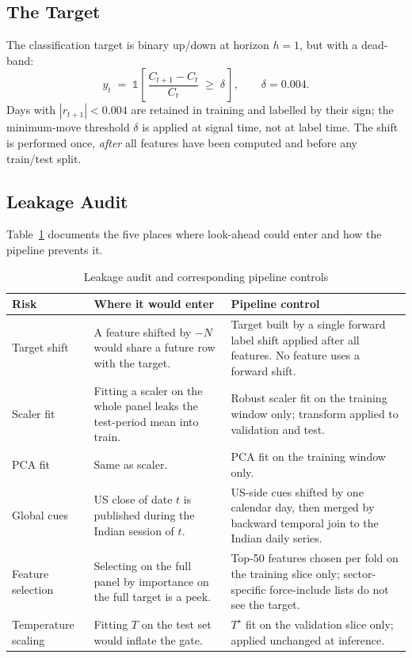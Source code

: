 \subsection{The Target}

The classification target is binary up/down at horizon $h = 1$, but with a dead-band:
\[
    y_t \;=\; \mathbb{1}\!\left[\, \frac{C_{t+1} - C_t}{C_t} \;\geq\; \delta \,\right], \qquad \delta = 0.004.
\]
Days with $|r_{t+1}| < 0.004$ are retained in training and labelled by their sign; the minimum-move threshold $\delta$ is applied at signal time, not at label time. The shift is performed once, \emph{after} all features have been computed and before any train/test split.

\subsection{Leakage Audit}

Table~\ref{tab:leakage_audit} documents the five places where look-ahead could enter and how the pipeline prevents it.

\begin{table}[H]
\centering
\caption{Leakage audit and corresponding pipeline controls}
\label{tab:leakage_audit}
\renewcommand{\arraystretch}{1.25}
\footnotesize
\begin{tabularx}{\textwidth}{@{}>{\raggedright\arraybackslash}p{2.6cm} >{\raggedright\arraybackslash}X >{\raggedright\arraybackslash}X@{}}
\toprule
\textbf{Risk} & \textbf{Where it would enter} & \textbf{Pipeline control} \\
\midrule
Target shift              & A feature shifted by $-N$ would share a future row with the target. & Target built by a single forward label shift applied after all features. No feature uses a forward shift. \\
Scaler fit                & Fitting a scaler on the whole panel leaks the test-period mean into train. & Robust scaler fit on the training window only; transform applied to validation and test. \\
PCA fit                   & Same as scaler.                                                       & PCA fit on the training window only. \\
Global cues               & US close of date $t$ is published during the Indian session of $t$. & US-side cues shifted by one calendar day, then merged by backward temporal join to the Indian daily series. \\
Feature selection         & Selecting on the full panel by importance on the full target is a peek. & Top-50 features chosen per fold on the training slice only; sector-specific force-include lists do not see the target. \\
Temperature scaling       & Fitting $T$ on the test set would inflate the gate.                  & $T^\star$ fit on the validation slice only; applied unchanged at inference. \\
\bottomrule
\end{tabularx}
\end{table}

